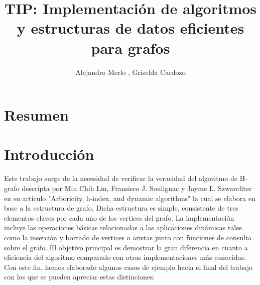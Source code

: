 \documentclass[a4paper,12pt]{article}
\begin{document}
\title{TIP:  Implementaci\'on de algoritmos y estructuras de datos eficientes para grafos}

\author{Alejandro Merlo , Griselda Cardozo \\[4pt]}
\date{} %


\maketitle

\section{Resumen}
\label{sec1}

\section{Introducci\'on}
\label{sec2}
Este trabajo surge de la necesidad de verificar la veracidad del algoritmo de H-grafo descripta por Min Chih Lin, Fransisco J. Soulignac y Jayme L. Szwarcfiter en su art\'iculo "Arboricity, h-index, and dynamic algorithms" la cual se elabora en base a la estructura de grafo. Dicha estructura es simple, consistente de tres elementos claves por cada uno de los vertices del grafo. La implementaci\'on incluye las operaciones b\'asicas relacionadas a las aplicaciones din\'amicas tales como la inserci\'on y borrado de vertices o aristas junto con funciones de consulta sobre el grafo. El objetivo principal es demostrar la gran diferencia en cuanto a eficiencia del algoritmo comparado con otras implementaciones m\'as conocidas. Con este fin, hemos elaborado algunos casos de ejemplo hacia el final del trabajo con los que se pueden apreciar estas distinciones.
\end{document}
